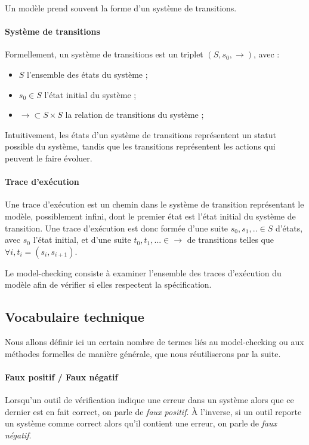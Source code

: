 Un modèle prend souvent la forme d'un système de transitions.

\paragraph{Système de transitions}
Formellement, un système de transitions est un triplet \((S, s_0, \rightarrow)\),
avec :

\begin{itemize}
\item
  \(S\) l'ensemble des états du système ;
\item
  \(s_0 \in S\) l'état initial du système ;
\item
  \(\rightarrow \subset S \times S\) la relation de transitions du
  système ;
\end{itemize}

Intuitivement, les états d'un système de transitions représentent un
statut possible du système, tandis que les transitions représentent les
actions qui peuvent le faire évoluer.

\paragraph{Trace d'exécution}
Une trace d'exécution est un chemin dans le système de transition représentant
le modèle, possiblement infini, dont le premier état est l'état initial du
système de transition. Une trace d'exécution est donc formée d'une suite \(s_0,
s_1, .. \in S\) d'états, avec \(s_0\) l'état initial, et d'une suite \(t_0, t_1,
... \in \rightarrow\) de transitions telles que \(\forall i, t_i = (s_i,
s_{i+1})\).

Le model-checking consiste à examiner l'ensemble des traces
d'exécution du modèle afin de vérifier si elles respectent la spécification.

\subsection{Vocabulaire technique}

Nous allons définir ici un certain nombre de termes liés au model-checking ou
aux méthodes formelles de manière générale, que nous réutiliserons par la suite.

\paragraph{Faux positif / Faux négatif}

Lorsqu'un outil de vérification indique une erreur dans un système alors que ce
dernier est en fait correct, on parle de \emph{faux positif}. À l'inverse, si un
outil reporte un système comme correct alors qu'il contient une erreur, on parle
de \emph{faux négatif}.

